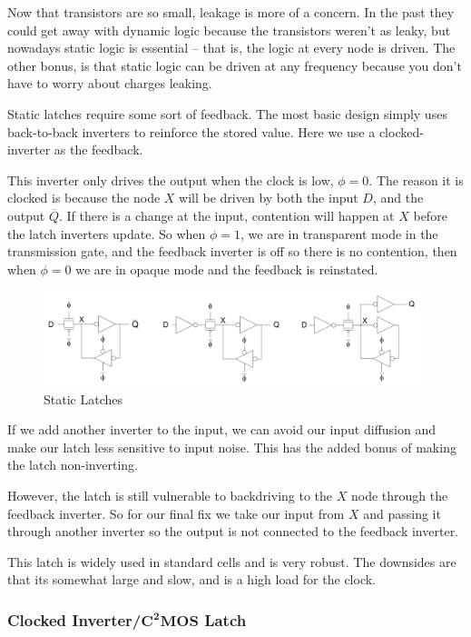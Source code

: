 \documentclass{article}
\begin{document}
Now that transistors are so small, leakage is more of a concern. In the past they could get away with dynamic logic because the transistors weren't as leaky, but nowadays static logic is essential -- that is, the logic at every node is driven. The other bonus, is that static logic can be driven at any frequency because you don't have to worry about charges leaking. 

Static latches require some sort of feedback. The most basic design simply uses back-to-back inverters to reinforce the stored value. Here we use a clocked-inverter as the feedback. 

This inverter only drives the output when the clock is low, $\phi=0$. The reason it is clocked is because the node $X$ will be driven by both the input $D$, and the output $\overline{Q}$. If there is a change at the input, contention will happen at $X$ before the latch inverters update. So when $\phi=1$, we are in transparent mode in the transmission gate, and the feedback inverter is off so there is no contention, then when $\phi=0$ we are in opaque mode and the feedback is reinstated. 


\begin{figure}[ht!]
\centering
\includegraphics[width=110mm]{StaticLatches.png}
\caption{Static Latches}
\end{figure}

If we add another inverter to the input, we can avoid our input diffusion and make our latch less sensitive to input noise. This has the added bonus of making the latch non-inverting. 

However, the latch is still vulnerable to backdriving to the $X$ node through the feedback inverter. So for our final fix we take our input from $X$ and passing it through another inverter so the output is not connected to the feedback inverter. 

This latch is widely used in standard cells and is very robust. The downsides are that its somewhat large and slow, and is a high load for the clock. 

\subsubsection{Clocked Inverter/$\mathbf{C^2MOS}$ Latch}
\end{document}
